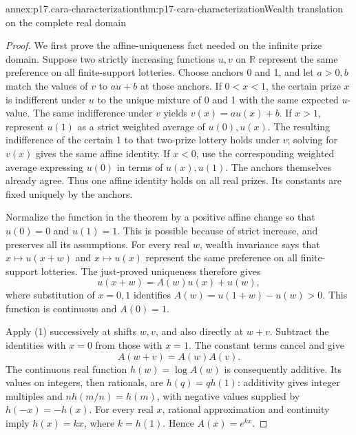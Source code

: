 \begin{annexitem}{annex:p17.cara-characterization}{thm:p17-cara-characterization}{Wealth translation on the complete real domain}
\begin{proof}
We first prove the affine-uniqueness fact needed on the infinite prize
domain. Suppose two strictly increasing functions \(u,v\) on
\(\mathbb R\) represent the same preference on all finite-support
lotteries. Choose anchors 0 and 1, and let \(a>0,b\) match the
values of \(v\) to \(a u+b\) at those anchors. If \(0<x<1\),
the certain prize \(x\) is indifferent under \(u\) to the unique
mixture of 0 and 1 with the same expected \(u\)-value. The same
indifference under \(v\) yields \(v(x)=a u(x)+b\). If \(x>1\),
represent \(u(1)\) as a strict weighted average of \(u(0),u(x)\).
The resulting indifference of the certain 1 to that two-prize lottery
holds under \(v\); solving for \(v(x)\) gives the same affine
identity. If \(x<0\), use the corresponding weighted average
expressing \(u(0)\) in terms of \(u(x),u(1)\). The anchors themselves
already agree. Thus one affine identity holds on all real prizes.
Its constants are fixed uniquely by the anchors.

Normalize the function in the theorem by a positive affine change so
that \(u(0)=0\) and \(u(1)=1\). This is possible because of strict
increase, and preserves all its assumptions. For every real \(w\),
wealth invariance says that \(x\mapsto u(x+w)\) and \(x\mapsto u(x)\)
represent the same preference on all finite-support lotteries. The
just-proved uniqueness therefore gives
\[
                         u(x+w)=A(w)u(x)+u(w),
\tag{1}
\]
where substitution of \(x=0,1\) identifies
\(A(w)=u(1+w)-u(w)>0\). This function is continuous and \(A(0)=1\).

Apply (1) successively at shifts \(w,v\), and also directly at
\(w+v\). Subtract the identities with \(x=0\) from those with
\(x=1\). The constant terms cancel and give
\[
                             A(w+v)=A(w)A(v).
\]
The continuous real function \(h(w)=\log A(w)\) is consequently
additive. Its values on integers, then rationals, are
\(h(q)=q h(1)\): additivity gives integer multiples and
\(n h(m/n)=h(m)\), with negative values supplied by \(h(-x)=-h(x)\).
For every real \(x\), rational approximation and continuity imply
\(h(x)=k x\), where \(k=h(1)\). Hence \(A(x)=e^{kx}\).


\end{proof}
\end{annexitem}
